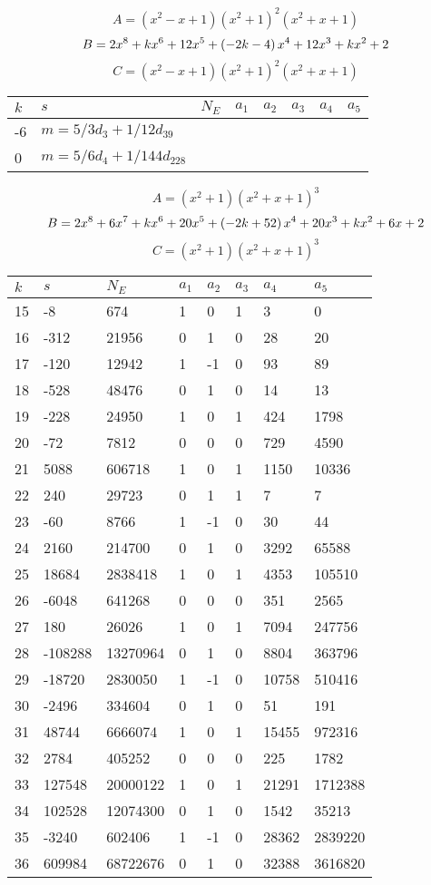 \documentclass{amsart}
\begin{document}
$$A=(x^2
 - x
 + 1)(x^2
 + 1)^{2}(x^2
 + x
 + 1)$$
$$B=2\*x^8
 + k\*x^6
 + 12\*x^5
 + \left(-2\*k
 - 4\right) \*x^4
 + 12\*x^3
 + k\*x^2
 + 2$$
$$C=(x^2
 - x
 + 1)(x^2
 + 1)^{2}(x^2
 + x
 + 1)$$
\begin{longtable}{|l|l|l|lllll|}
\hline
$k$ & $s$ & $N_E$ & $a_1$ & $a_2$ & $a_3$ & $a_4$ & $a_5$\\
\hline
-6&$m=5/3d_{3}+1/12d_{39}$&&\multicolumn{5}{c|}{}\\
0&$m=5/6d_{4}+1/144d_{228}$&&\multicolumn{5}{c|}{}\\
\hline
\end{longtable}
$$A=(x^2
 + 1)(x^2
 + x
 + 1)^{3}$$
$$B=2\*x^8
 + 6\*x^7
 + k\*x^6
 + 20\*x^5
 + \left(-2\*k
 + 52\right) \*x^4
 + 20\*x^3
 + k\*x^2
 + 6\*x
 + 2$$
$$C=(x^2
 + 1)(x^2
 + x
 + 1)^{3}$$
\begin{longtable}{|l|l|l|lllll|}
\hline
$k$ & $s$ & $N_E$ & $a_1$ & $a_2$ & $a_3$ & $a_4$ & $a_5$\\
\hline
15&-8&674&1&0&1&3&0\\
16&-312&21956&0&1&0&28&20\\
17&-120&12942&1&-1&0&93&89\\
18&-528&48476&0&1&0&14&13\\
19&-228&24950&1&0&1&424&1798\\
20&-72&7812&0&0&0&729&4590\\
21&5088&606718&1&0&1&1150&10336\\
22&240&29723&0&1&1&7&7\\
23&-60&8766&1&-1&0&30&44\\
24&2160&214700&0&1&0&3292&65588\\
25&18684&2838418&1&0&1&4353&105510\\
26&-6048&641268&0&0&0&351&2565\\
27&180&26026&1&0&1&7094&247756\\
28&-108288&13270964&0&1&0&8804&363796\\
29&-18720&2830050&1&-1&0&10758&510416\\
30&-2496&334604&0&1&0&51&191\\
31&48744&6666074&1&0&1&15455&972316\\
32&2784&405252&0&0&0&225&1782\\
33&127548&20000122&1&0&1&21291&1712388\\
34&102528&12074300&0&1&0&1542&35213\\
35&-3240&602406&1&-1&0&28362&2839220\\
36&609984&68722676&0&1&0&32388&3616820\\

\end{longtable}
\end{document}
